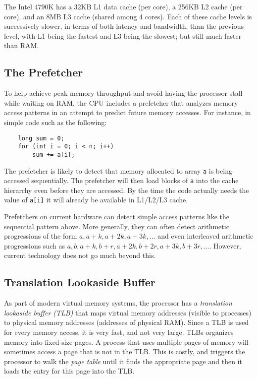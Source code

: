 \documentclass{patmorin}
\begin{document}
The Intel 4790K has a 32KB L1 data cache (per core), a 256KB L2 cache (per
core), and an 8MB L3 cache (shared among 4 cores).  Each of these cache
levels is successively slower, in terms of both latency and bandwidth,
than the previous level, with L1 being the fastest and L3 being the slowest;
but still much faster than RAM.

\subsection{The Prefetcher}

To help achieve peak memory throughput and avoid having the processor
stall while waiting on RAM, the CPU includes a prefetcher that analyzes
memory access patterns in an attempt to predict future memory accesses.
For instance, in simple code such as the following:

\begin{verbatim}
    long sum = 0;
    for (int i = 0; i < n; i++) 
        sum += a[i];
\end{verbatim}

The prefetcher is likely to detect that memory allocated to array
\texttt{a} is being accessed sequentially.  The prefetcher will
then load blocks of \texttt{a} into the cache hierarchy even
before they are accessed.  By the time the code actually needs the value
of \texttt{a[i]} it will already be available in L1/L2/L3 cache.

Prefetchers on current hardware can detect simple access patterns
like the sequential pattern above.  More generally, they can often
detect arithmetic progressions of the form $a,a+k,a+2k,a+3k,\ldots$
and even interleaved arithmetic progressions such as $a, b, a+k, b+r,
a+2k,b+2r,a+3k,b+3r,\ldots$.  However, current technology does not go
much beyond this.

\subsection{Translation Lookaside Buffer}

As part of modern virtual memory systems, the processor has a
\emph{translation lookaside buffer (TLB)} that maps virtual memory
addresses (visible to processes) to physical memory addresses (addresses
of physical RAM).  Since a TLB is used for every memory access, it is very
fast, and not very large.  TLBs organizes memory into fixed-size pages.
A process that uses multiple pages of memory will sometimes access a
page that is not in the TLB. This is costly, and triggers the processor
to walk the \emph{page table} until it finds the appropriate page and
then it loads the entry for this page into the TLB.
\end{document}
